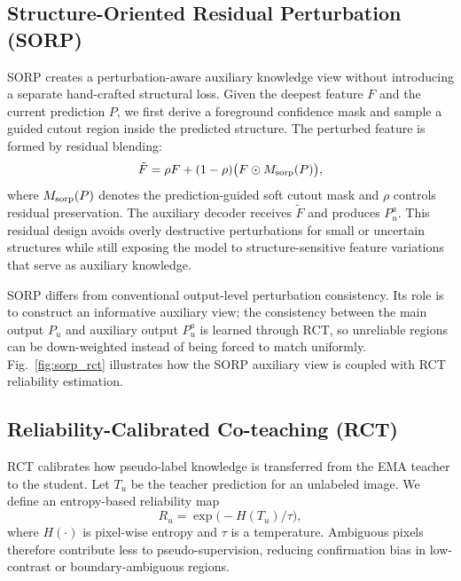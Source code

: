 \documentclass[a4paper,fleqn]{cas-dc}
\begin{document}
\subsection{Structure-Oriented Residual Perturbation (SORP)}
\label{sec:sorp}

SORP creates a perturbation-aware auxiliary knowledge view without introducing a separate hand-crafted structural loss. Given the deepest feature $F$ and the current prediction $P$, we first derive a foreground confidence mask and sample a guided cutout region inside the predicted structure. The perturbed feature is formed by residual blending:
\begin{equation}
\tilde{F}=\rho F+(1-\rho)\big(F\odot M_{\rm sorp}(P)\big),
\end{equation}
where $M_{\rm sorp}(P)$ denotes the prediction-guided soft cutout mask and $\rho$ controls residual preservation. The auxiliary decoder receives $\tilde{F}$ and produces $P_u^{a}$. This residual design avoids overly destructive perturbations for small or uncertain structures while still exposing the model to structure-sensitive feature variations that serve as auxiliary knowledge.

SORP differs from conventional output-level perturbation consistency. Its role is to construct an informative auxiliary view; the consistency between the main output $P_u$ and auxiliary output $P_u^{a}$ is learned through RCT, so unreliable regions can be down-weighted instead of being forced to match uniformly. Fig.~\ref{fig:sorp_rct} illustrates how the SORP auxiliary view is coupled with RCT reliability estimation.

\subsection{Reliability-Calibrated Co-teaching (RCT)}
\label{sec:rcc}

RCT calibrates how pseudo-label knowledge is transferred from the EMA teacher to the student. Let $T_u$ be the teacher prediction for an unlabeled image. We define an entropy-based reliability map
\begin{equation}
R_u=\exp\big(-H(T_u)/\tau\big),
\end{equation}
where $H(\cdot)$ is pixel-wise entropy and $\tau$ is a temperature. Ambiguous pixels therefore contribute less to pseudo-supervision, reducing confirmation bias in low-contrast or boundary-ambiguous regions.
\end{document}
